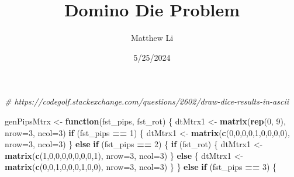 \documentclass[
]{article}
\title{Domino Die Problem}
\author{Matthew Li}
\date{5/25/2024}
\newenvironment{Shaded}{\begin{snugshade}}{\end{snugshade}}
\newcommand{\AttributeTok}[1]{\textcolor[rgb]{0.13,0.29,0.53}{#1}}
\newcommand{\CommentTok}[1]{\textcolor[rgb]{0.56,0.35,0.01}{\textit{#1}}}
\newcommand{\ControlFlowTok}[1]{\textcolor[rgb]{0.13,0.29,0.53}{\textbf{#1}}}
\newcommand{\DecValTok}[1]{\textcolor[rgb]{0.00,0.00,0.81}{#1}}
\newcommand{\FunctionTok}[1]{\textcolor[rgb]{0.13,0.29,0.53}{\textbf{#1}}}
\newcommand{\NormalTok}[1]{#1}
\newcommand{\OtherTok}[1]{\textcolor[rgb]{0.56,0.35,0.01}{#1}}
\newcommand{\SpecialCharTok}[1]{\textcolor[rgb]{0.81,0.36,0.00}{\textbf{#1}}}
\begin{document}
\maketitle

\begin{Shaded}
\begin{Highlighting}[]
\CommentTok{\# https://codegolf.stackexchange.com/questions/2602/draw{-}dice{-}results{-}in{-}ascii}


\NormalTok{genPipsMtrx }\OtherTok{\textless{}{-}} \ControlFlowTok{function}\NormalTok{(fst\_pips, fst\_rot) \{}
\NormalTok{  dtMtrx1 }\OtherTok{\textless{}{-}} \FunctionTok{matrix}\NormalTok{(}\FunctionTok{rep}\NormalTok{(}\DecValTok{0}\NormalTok{, }\DecValTok{9}\NormalTok{), }\AttributeTok{nrow=}\DecValTok{3}\NormalTok{, }\AttributeTok{ncol=}\DecValTok{3}\NormalTok{)}
  \ControlFlowTok{if}\NormalTok{ (fst\_pips }\SpecialCharTok{==} \DecValTok{1}\NormalTok{) \{}
\NormalTok{    dtMtrx1 }\OtherTok{\textless{}{-}} \FunctionTok{matrix}\NormalTok{(}\FunctionTok{c}\NormalTok{(}\DecValTok{0}\NormalTok{,}\DecValTok{0}\NormalTok{,}\DecValTok{0}\NormalTok{,}\DecValTok{0}\NormalTok{,}\DecValTok{1}\NormalTok{,}\DecValTok{0}\NormalTok{,}\DecValTok{0}\NormalTok{,}\DecValTok{0}\NormalTok{,}\DecValTok{0}\NormalTok{), }\AttributeTok{nrow=}\DecValTok{3}\NormalTok{, }\AttributeTok{ncol=}\DecValTok{3}\NormalTok{)}
\NormalTok{  \} }\ControlFlowTok{else} \ControlFlowTok{if}\NormalTok{ (fst\_pips }\SpecialCharTok{==} \DecValTok{2}\NormalTok{) \{}
    \ControlFlowTok{if}\NormalTok{ (fst\_rot) \{}
\NormalTok{      dtMtrx1 }\OtherTok{\textless{}{-}} \FunctionTok{matrix}\NormalTok{(}\FunctionTok{c}\NormalTok{(}\DecValTok{1}\NormalTok{,}\DecValTok{0}\NormalTok{,}\DecValTok{0}\NormalTok{,}\DecValTok{0}\NormalTok{,}\DecValTok{0}\NormalTok{,}\DecValTok{0}\NormalTok{,}\DecValTok{0}\NormalTok{,}\DecValTok{0}\NormalTok{,}\DecValTok{1}\NormalTok{), }\AttributeTok{nrow=}\DecValTok{3}\NormalTok{, }\AttributeTok{ncol=}\DecValTok{3}\NormalTok{)}
\NormalTok{    \} }\ControlFlowTok{else}\NormalTok{ \{}
\NormalTok{      dtMtrx1 }\OtherTok{\textless{}{-}} \FunctionTok{matrix}\NormalTok{(}\FunctionTok{c}\NormalTok{(}\DecValTok{0}\NormalTok{,}\DecValTok{0}\NormalTok{,}\DecValTok{1}\NormalTok{,}\DecValTok{0}\NormalTok{,}\DecValTok{0}\NormalTok{,}\DecValTok{0}\NormalTok{,}\DecValTok{1}\NormalTok{,}\DecValTok{0}\NormalTok{,}\DecValTok{0}\NormalTok{), }\AttributeTok{nrow=}\DecValTok{3}\NormalTok{, }\AttributeTok{ncol=}\DecValTok{3}\NormalTok{)}
\NormalTok{    \}}
\NormalTok{  \} }\ControlFlowTok{else} \ControlFlowTok{if}\NormalTok{ (fst\_pips }\SpecialCharTok{==} \DecValTok{3}\NormalTok{) \{}

\end{Highlighting}
\end{Shaded}
\end{document}
